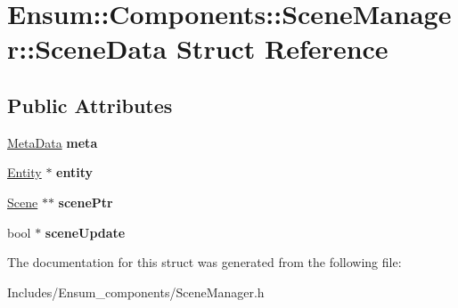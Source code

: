 \hypertarget{struct_ensum_1_1_components_1_1_scene_manager_1_1_scene_data}{}\section{Ensum\+:\+:Components\+:\+:Scene\+Manager\+:\+:Scene\+Data Struct Reference}
\label{struct_ensum_1_1_components_1_1_scene_manager_1_1_scene_data}
\subsection*{Public Attributes}
\begin{DoxyCompactItemize}
\item 
\hyperlink{struct_meta_data}{Meta\+Data} {\bfseries meta}\hypertarget{struct_ensum_1_1_components_1_1_scene_manager_1_1_scene_data_a86f40c9cb2aa13ae41ee7521dcf416cc}{}\label{struct_ensum_1_1_components_1_1_scene_manager_1_1_scene_data_a86f40c9cb2aa13ae41ee7521dcf416cc}

\item 
\hyperlink{struct_ensum_1_1_components_1_1_entity}{Entity} $\ast$ {\bfseries entity}\hypertarget{struct_ensum_1_1_components_1_1_scene_manager_1_1_scene_data_aff477aef5752b1b0f438ef0e986a9229}{}\label{struct_ensum_1_1_components_1_1_scene_manager_1_1_scene_data_aff477aef5752b1b0f438ef0e986a9229}

\item 
\hyperlink{class_ensum_1_1_components_1_1_scene}{Scene} $\ast$$\ast$ {\bfseries scene\+Ptr}\hypertarget{struct_ensum_1_1_components_1_1_scene_manager_1_1_scene_data_ac37964615c53887051adcc587fa9dab0}{}\label{struct_ensum_1_1_components_1_1_scene_manager_1_1_scene_data_ac37964615c53887051adcc587fa9dab0}

\item 
bool $\ast$ {\bfseries scene\+Update}\hypertarget{struct_ensum_1_1_components_1_1_scene_manager_1_1_scene_data_a7d4a9e3d7aed5dc8f338b4d4a312f875}{}\label{struct_ensum_1_1_components_1_1_scene_manager_1_1_scene_data_a7d4a9e3d7aed5dc8f338b4d4a312f875}

\end{DoxyCompactItemize}


The documentation for this struct was generated from the following file\+:\begin{DoxyCompactItemize}
\item 
Includes/\+Ensum\+\_\+components/Scene\+Manager.\+h\end{DoxyCompactItemize}
